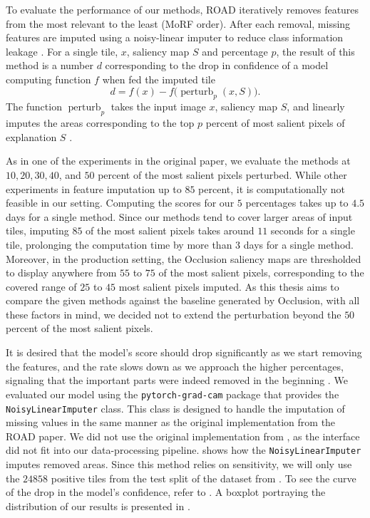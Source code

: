 To evaluate the performance of our methods, ROAD iteratively removes features from the most relevant to the least (MoRF order).
After each removal, missing features are imputed using a noisy-linear imputer to reduce class information leakage \cite{road}.
For a single tile, $x$, saliency map $S$ and percentage $p$, the result of this method is a number $d$ corresponding to the drop in confidence of a model computing function $f$ when fed the imputed tile
\begin{equation}
    d = f(x) - f\bigl(\operatorname{perturb}_p(x, S)\bigr).
\end{equation}
The function $\operatorname{perturb}_p$ takes the input image $x$, saliency map $S$, and linearly imputes the areas corresponding to the top $p$ percent of most salient pixels of explanation $S$ \cite{road}.

As in one of the experiments in the original paper, we evaluate the methods at $10, 20, 30, 40$, and $50$ percent of the most salient pixels perturbed.
While other experiments in \cite{road} feature imputation up to $85$ percent, it is computationally not feasible in our setting.
Computing the scores for our $5$ percentages takes up to $4.5$ days for a single method.
Since our methods tend to cover larger areas of input tiles, imputing $85$ of the most salient pixels takes around $11$ seconds for a single tile, prolonging the computation time by more than $3$ days for a single method.
Moreover, in the production setting, the Occlusion saliency maps are thresholded to display anywhere from $55$ to $75$ of the most salient pixels, corresponding to the covered range of $25$ to $45$ most salient pixels imputed.
As this thesis aims to compare the given methods against the baseline generated by Occlusion, with all these factors in mind, we decided not to extend the perturbation beyond the $50$ percent of the most salient pixels.

It is desired that the model's score should drop significantly as we start removing the features, and the rate slows down as we approach the higher percentages, signaling that the important parts were indeed removed in the beginning \cite{road}.
We evaluated our model using the \texttt{pytorch-grad-cam} package that provides the \texttt{NoisyLinearImputer} class.
This class is designed to handle the imputation of missing values in the same manner as the original implementation from the ROAD paper.
We did not use the original implementation from \cite{road}, as the interface did not fit into our data-processing pipeline.
 shows how the \texttt{NoisyLinearImputer} imputes removed areas.
Since this method relies on sensitivity, we will only use the $24858$ positive tiles from the test split of the dataset from .
To see the curve of the drop in the model's confidence, refer to .
A boxplot portraying the distribution of our results is presented in .

